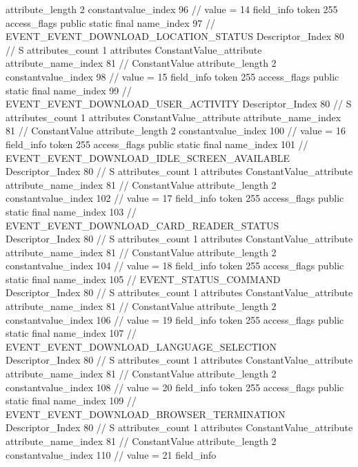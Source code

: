 {{{{{{{					attribute_length	2
					constantvalue_index	96		// value = 14
				}
				}
			}
			field_info {
				token	255
				access_flags	public static final
				name_index	97		// EVENT_EVENT_DOWNLOAD_LOCATION_STATUS
				Descriptor_Index	80		// S
				attributes_count	1
				attributes {
				ConstantValue_attribute {
					attribute_name_index	81		// ConstantValue
					attribute_length	2
					constantvalue_index	98		// value = 15
				}
				}
			}
			field_info {
				token	255
				access_flags	public static final
				name_index	99		// EVENT_EVENT_DOWNLOAD_USER_ACTIVITY
				Descriptor_Index	80		// S
				attributes_count	1
				attributes {
				ConstantValue_attribute {
					attribute_name_index	81		// ConstantValue
					attribute_length	2
					constantvalue_index	100		// value = 16
				}
				}
			}
			field_info {
				token	255
				access_flags	public static final
				name_index	101		// EVENT_EVENT_DOWNLOAD_IDLE_SCREEN_AVAILABLE
				Descriptor_Index	80		// S
				attributes_count	1
				attributes {
				ConstantValue_attribute {
					attribute_name_index	81		// ConstantValue
					attribute_length	2
					constantvalue_index	102		// value = 17
				}
				}
			}
			field_info {
				token	255
				access_flags	public static final
				name_index	103		// EVENT_EVENT_DOWNLOAD_CARD_READER_STATUS
				Descriptor_Index	80		// S
				attributes_count	1
				attributes {
				ConstantValue_attribute {
					attribute_name_index	81		// ConstantValue
					attribute_length	2
					constantvalue_index	104		// value = 18
				}
				}
			}
			field_info {
				token	255
				access_flags	public static final
				name_index	105		// EVENT_STATUS_COMMAND
				Descriptor_Index	80		// S
				attributes_count	1
				attributes {
				ConstantValue_attribute {
					attribute_name_index	81		// ConstantValue
					attribute_length	2
					constantvalue_index	106		// value = 19
				}
				}
			}
			field_info {
				token	255
				access_flags	public static final
				name_index	107		// EVENT_EVENT_DOWNLOAD_LANGUAGE_SELECTION
				Descriptor_Index	80		// S
				attributes_count	1
				attributes {
				ConstantValue_attribute {
					attribute_name_index	81		// ConstantValue
					attribute_length	2
					constantvalue_index	108		// value = 20
				}
				}
			}
			field_info {
				token	255
				access_flags	public static final
				name_index	109		// EVENT_EVENT_DOWNLOAD_BROWSER_TERMINATION
				Descriptor_Index	80		// S
				attributes_count	1
				attributes {
				ConstantValue_attribute {
					attribute_name_index	81		// ConstantValue
					attribute_length	2
					constantvalue_index	110		// value = 21
				}
				}
			}
			field_info {
}}}}}
